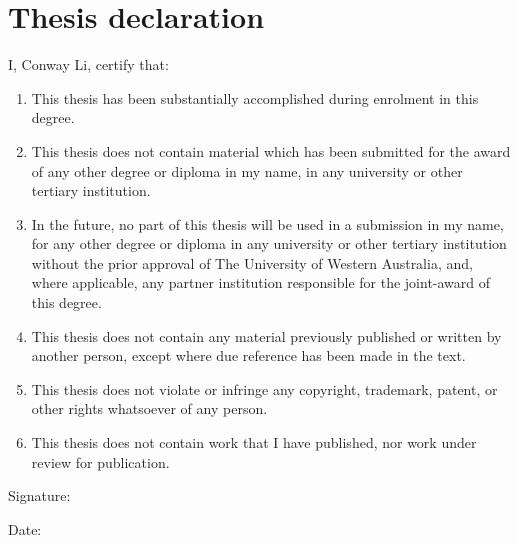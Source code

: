 \chapter{Thesis declaration}
\label{ch:declaration}

I, Conway Li, certify that:

\begin{enumerate}
  \item
    This thesis has been substantially accomplished
    during enrolment in this degree.
  \item
    This thesis does not contain material
    which has been submitted for the award of
    any other degree or diploma in my name,
    in any university or other tertiary institution.
  \item
    In the future,
    no part of this thesis will be used in a submission in my name,
    for any other degree or diploma
    in any university or other tertiary institution
    without the prior approval of The University of Western Australia,
    and, where applicable,
    any partner institution responsible for the joint-award of this degree.
  \item
    This thesis does not contain any material
    previously published or written by another person,
    except where due reference has been made in the text.
  \item
    This thesis does not violate or infringe
    any copyright, trademark, patent, or other rights whatsoever
    of any person.
  \item
    This thesis does not contain work that I have published,
    nor work under review for publication.
\end{enumerate}

Signature:

Date:
